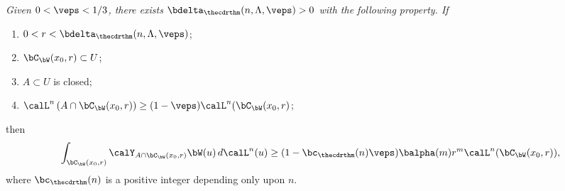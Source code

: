 \begin{Empty}
\label{54}
{\it
Given $0 < \veps < 1/3$, there exists $\bdelta_{\thecdrthm}(n,\Lambda,\veps)>0$ with the following property. If
\begin{enumerate}
\item\label{enum:54.1} $0 < r < \bdelta_{\thecdrthm}(n,\Lambda,\veps)$;
\item\label{enum:54.2} $\bC_\bW(x_0,r) \subset U$;
\item\label{enum:54.3} $A \subset U$ is closed;
\item\label{enum:54.4} $\calL^n \left(A \cap \bC_\bW(x_0,r) \right) \geq (1 - \veps) \calL^n (\bC_\bW(x_0,r)$;
\end{enumerate}
then
\begin{equation*}
\int_{\bC_\bW(x_0,r)} \calY_{A \cap \bC_\bW(x_0,r)} \bW (u) \,d\calL^n(u) \geq (1 - \bc_{\thecdrthm}(n) \veps) \balpha(m)r^m\calL^n(\bC_\bW(x_0,r)),
\end{equation*}
where $\bc_{\thecdrthm}(n)$ is a positive integer depending only upon $n$.
}
\end{Empty}

